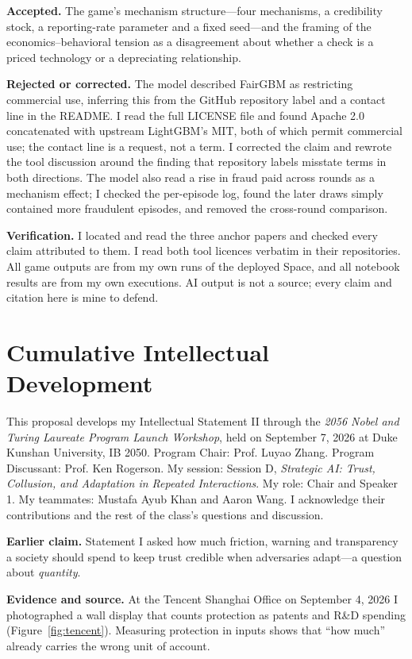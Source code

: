 \textbf{Accepted.} The game's mechanism structure---four mechanisms, a credibility stock, a reporting-rate parameter and a fixed seed---and the framing of the economics--behavioral tension as a disagreement about whether a check is a priced technology or a depreciating relationship.

\textbf{Rejected or corrected.} The model described FairGBM as restricting commercial use, inferring this from the GitHub repository label and a contact line in the README. I read the full LICENSE file and found Apache 2.0 concatenated with upstream LightGBM's MIT, both of which permit commercial use; the contact line is a request, not a term. I corrected the claim and rewrote the tool discussion around the finding that repository labels misstate terms in both directions. The model also read a rise in fraud paid across rounds as a mechanism effect; I checked the per-episode log, found the later draws simply contained more fraudulent episodes, and removed the cross-round comparison.

\textbf{Verification.} I located and read the three anchor papers and checked every claim attributed to them. I read both tool licences verbatim in their repositories. All game outputs are from my own runs of the deployed Space, and all notebook results are from my own executions. AI output is not a source; every claim and citation here is mine to defend.

\section{Cumulative Intellectual Development}
\label{app:cid}
This proposal develops my Intellectual Statement II through the \emph{2056 Nobel and Turing Laureate Program Launch Workshop}, held on September 7, 2026 at Duke Kunshan University, IB 2050. Program Chair: Prof. Luyao Zhang. Program Discussant: Prof. Ken Rogerson. My session: Session D, \emph{Strategic AI: Trust, Collusion, and Adaptation in Repeated Interactions}. My role: Chair and Speaker 1. My teammates: Mustafa Ayub Khan and Aaron Wang. I acknowledge their contributions and the rest of the class's questions and discussion.

\textbf{Earlier claim.} Statement I asked how much friction, warning and transparency a society should spend to keep trust credible when adversaries adapt---a question about \emph{quantity}.

\textbf{Evidence and source.} At the Tencent Shanghai Office on September 4, 2026 I photographed a wall display that counts protection as patents and R\&D spending (Figure~\ref{fig:tencent}). Measuring protection in inputs shows that ``how much'' already carries the wrong unit of account.

